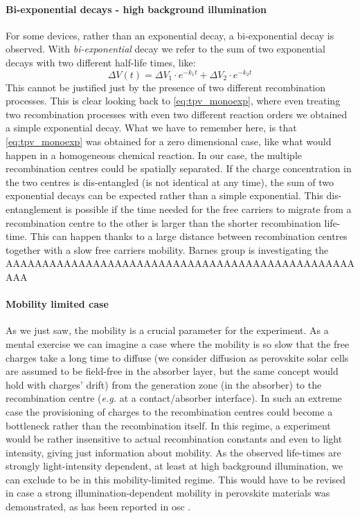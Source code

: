 	\paragraph{Bi-exponential decays - high background illumination}
	For some devices, rather than an exponential decay, a bi-exponential decay is observed. With \emph{bi-exponential} decay we refer to the sum of two exponential decays with two different half-life times, like:
	$$\Delta V (t) = \Delta V_1 \cdot e^{-k_1t} + \Delta V_2 \cdot e^{-k_2t}$$
	This cannot be justified just by the presence of two different recombination processes.
	This is clear looking back to \cref{eq:tpv_monoexp}, where even treating two recombination processes with even two different reaction orders we obtained a simple exponential decay.
	What we have to remember here, is that \cref{eq:tpv_monoexp} was obtained for a zero dimensional case, like what would happen in a homogeneous chemical reaction.
	In our case, the multiple recombination centres could be spatially separated.
	If the charge concentration in the two centres is dis-entangled (is not identical at any time), the sum of two exponential decays can be expected rather than a simple exponential.
	This dis-entanglement is possible if the time needed for the free carriers to migrate from a recombination centre to the other is larger than the shorter recombination life-time.
	This can happen thanks to a large distance between recombination centres together with a slow free carriers mobility.
	Barnes group is investigating the AAAAAAAAAAAAAAAAAAAAAAAAAAAAAAAAAAAAAAAAAAAAAAAAAAA \cite{Montcada2017}
	
	\paragraph{Mobility limited case}
	As we just saw, the mobility is a crucial parameter for the  experiment.
	As a mental exercise we can imagine a case where the mobility is so slow that the free charges take a long time to diffuse (we consider diffusion as perovskite solar cells are assumed to be field-free in the absorber layer, but the same concept would hold with charges' drift) from the generation zone (in the absorber) to the recombination centre (\textit{e.g.} at a contact/absorber interface).
	In such an extreme case the provisioning of charges to the recombination centres could become a bottleneck rather than the recombination itself.
	In this regime, a  experiment would be rather insensitive to actual recombination constants and even to light intensity, giving just information about mobility.
	As the observed  life-times are strongly light-intensity dependent, at least at high background illumination, we can exclude to be in this mobility-limited regime.
	This would have to be revised in case a strong illumination-dependent mobility in perovskite materials was demonstrated, as has been reported in \gls{osc} \cite{Eng2010,Shuttle2010}.
	
